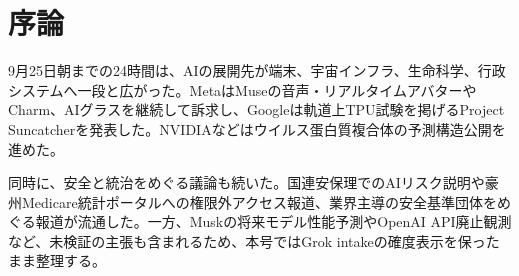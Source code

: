 \section*{序論}
9月25日朝までの24時間は、AIの展開先が端末、宇宙インフラ、生命科学、行政システムへ一段と広がった。MetaはMuseの音声・リアルタイムアバターやCharm、AIグラスを継続して訴求し、Googleは軌道上TPU試験を掲げるProject Suncatcherを発表した。NVIDIAなどはウイルス蛋白質複合体の予測構造公開を進めた。

同時に、安全と統治をめぐる議論も続いた。国連安保理でのAIリスク説明や豪州Medicare統計ポータルへの権限外アクセス報道、業界主導の安全基準団体をめぐる報道が流通した。一方、Muskの将来モデル性能予測やOpenAI API廃止観測など、未検証の主張も含まれるため、本号ではGrok intakeの確度表示を保ったまま整理する。
